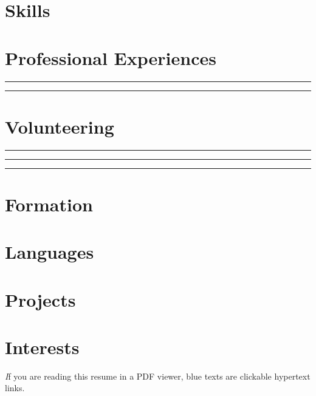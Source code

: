 \documentclass[
  10pt
]{resumeats}
\begin{document}



\makeheader

\section{Skills}

\bigskip

\section{Professional Experiences}




\textcolor{endrules}{\rule{0.975\linewidth}{0.5pt}}




\textcolor{endrules}{\rule{0.975\linewidth}{0.5pt}}







\bigskip
\section{Volunteering}


\textcolor{endrules}{\rule{0.975\linewidth}{0.5pt}}



\textcolor{endrules}{\rule{0.975\linewidth}{0.5pt}}



\textcolor{endrules}{\rule{0.975\linewidth}{0.5pt}}

\newpage


\section{Formation}


\bigskip
\section{Languages}



\bigskip
\section{Projects}


\bigskip
\section{Interests}


\begin{center}
	\vfill
	\scriptsize
	{
		\textit
		If you are reading this resume in a PDF viewer,
		{\color{blue-800}blue texts} are clickable hypertext links.
	}
\end{center}
\end{document}
